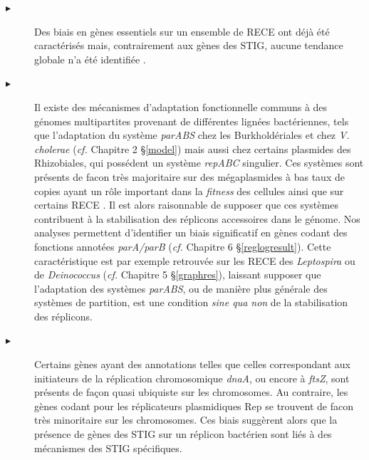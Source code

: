 \begin{description}
		\item[$\blacktriangleright$] Des biais en gènes essentiels sur un ensemble de RECE ont déjà été caractérisés mais, contrairement aux gènes des STIG, aucune  tendance globale n'a été identifiée \citep{Harrison2010,harrison2011bacterial}.
		 \item[$\blacktriangleright$] Il existe des mécanismes d'adaptation fonctionnelle communs à des génomes multipartites provenant de différentes lignées bactériennes, tels que l'adaptation du système \textit{parABS} chez les Burkholdériales et chez \textit{V. cholerae} (\textit{cf.} Chapitre 2 \S \ref{model}) mais aussi chez certains plasmides des Rhizobiales, qui possédent un système \textit{repABC} singulier. Ces systèmes sont présents de facon très majoritaire sur des mégaplasmides à bas taux de copies ayant un rôle important dans la \textit{fitness} des cellules ainsi que sur certains RECE \citep{Cervantes-Rivera2011,Petersen2013}. Il est alors raisonnable de supposer que ces systèmes contribuent à la stabilisation des réplicons accessoires dans le génome. Nos analyses permettent d'identifier un biais significatif en gènes codant des fonctions annotées \textit{parA/parB} (\textit{cf.} Chapitre 6 \S \ref{reglogresult}). Cette caractéristique est par exemple retrouvée sur les RECE des \textit{Leptospira} ou de \textit{Deinococcus} (\textit{cf.} Chapitre 5 \S \ref{graphres}), laissant supposer que l'adaptation des systèmes \textit{parABS}, ou de manière plus générale des systèmes de partition, est une condition \textit{sine qua non} de la stabilisation des réplicons.
		 \item[$\blacktriangleright$] Certains gènes ayant des annotations telles que celles correspondant aux initiateurs de la réplication chromosomique \textit{dnaA}, ou encore à \textit{ftsZ}, sont présents de façon quasi ubiquiste sur les chromosomes. Au contraire, les gènes codant pour les réplicateurs plasmidiques Rep se trouvent de facon très minoritaire sur les chromosomes. Ces biais suggèrent alors que la présence de gènes des STIG sur un réplicon bactérien sont liés à des mécanismes des STIG spécifiques.   

\end{description}
